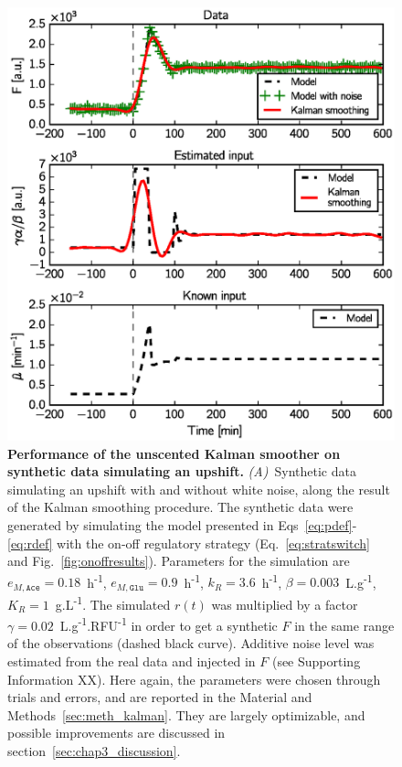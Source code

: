 \begin{figure}[p]
\centering
\includegraphics[scale=0.8]{./Fig/synthetic_upshift}
\caption{
\textbf{Performance of the unscented Kalman smoother on synthetic data simulating an upshift.}
\textit{(A)}~Synthetic data simulating an upshift with and without white noise, along the result of the Kalman smoothing procedure.
The synthetic data were generated by simulating the model presented in Eqs~\ref{eq:pdef}-\ref{eq:rdef} with the on-off regulatory strategy (Eq.~\ref{eq:stratswitch} and Fig.~\ref{fig:onoffresults}).
Parameters for the simulation are $e_{M,\texttt{Ace}} = 0.18$~h\textsuperscript{-1}, $e_{M,\texttt{Glu}} = 0.9$~h\textsuperscript{-1}, $k_R = 3.6$~h\textsuperscript{-1}, $\beta = 0.003$~L.g\textsuperscript{-1}, $K_R = 1$~g.L\textsuperscript{-1}.
The simulated $r(t)$ was multiplied by a factor $\gamma = 0.02$~L.g\textsuperscript{-1}.RFU\textsuperscript{-1} in order to get a synthetic $F$ in the same range of the observations (dashed black curve).
Additive noise level was estimated from the real data and injected in $F$ (see Supporting Information XX).
Here again, the parameters were chosen through trials and errors, and are reported in the Material and Methods~\ref{sec:meth_kalman}.
They are largely optimizable, and possible improvements are discussed in section~\ref{sec:chap3_discussion}.
}
\end{figure}
